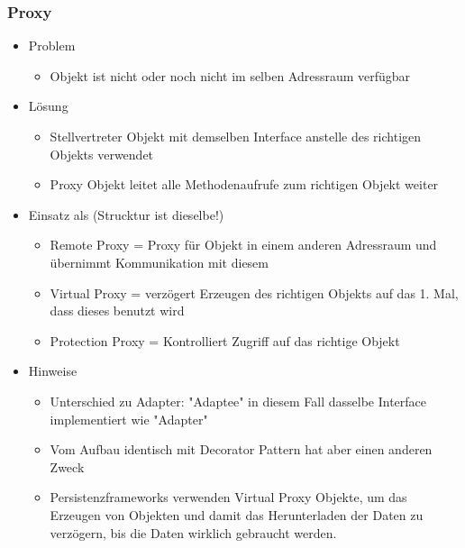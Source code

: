 \documentclass[../ZF_SWEN1.tex]{subfiles}
\begin{document}
\subsubsection{Proxy}
\begin{itemize}
	\item Problem
	\begin{itemize}
		\item Objekt ist nicht oder noch nicht im selben Adressraum verfügbar
	\end{itemize}
	\item Lösung
	\begin{itemize}
		\item Stellvertreter Objekt mit demselben Interface anstelle des richtigen Objekts verwendet
		\item Proxy Objekt leitet alle Methodenaufrufe zum richtigen Objekt weiter
	\end{itemize}
	\item Einsatz als (Strucktur ist dieselbe!)
	\begin{itemize}
		\item Remote Proxy = Proxy für Objekt in einem anderen Adressraum und übernimmt Kommunikation mit diesem
		\item Virtual Proxy = verzögert Erzeugen des richtigen Objekts auf das 1. Mal, dass dieses benutzt wird
		\item Protection Proxy = Kontrolliert Zugriff auf das richtige Objekt
	\end{itemize}
	\item Hinweise
	\begin{itemize}
		\item Unterschied zu Adapter: "Adaptee" in diesem Fall dasselbe Interface implementiert wie "Adapter"
		\item Vom Aufbau identisch mit Decorator Pattern hat aber einen anderen Zweck
		\item Persistenzframeworks verwenden Virtual Proxy Objekte, um das Erzeugen von Objekten und damit das Herunterladen der Daten zu verzögern, bis die Daten wirklich gebraucht werden.
	\end{itemize}
\end{itemize}
\end{document}

